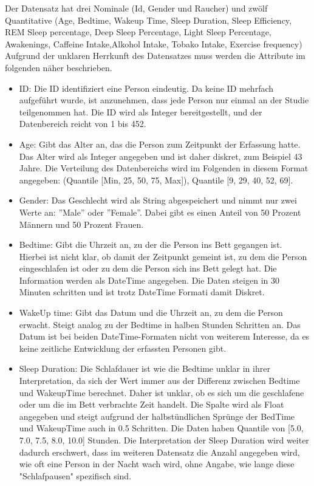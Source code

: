 \documentclass[usegeometry=true]{scrartcl}
\begin{document}
Der Datensatz hat drei Nominale (Id, Gender und Raucher) und zwölf Quantitative (Age, Bedtime, Wakeup Time, Sleep Duration, Sleep Efficiency, REM Sleep percentage, Deep Sleep Percentage, Light Sleep Percentage, Awakenings, Caffeine Intake,Alkohol Intake, Tobako Intake, Exercise frequency) Aufgrund der unklaren Herrkunft des Datensatzes muss werden die Attribute im folgenden näher beschrieben.\\
\begin{itemize}
  \item ID: Die ID identifiziert eine Person eindeutig. Da keine ID mehrfach aufgeführt wurde, ist anzunehmen, dass jede Person nur einmal an der Studie teilgenommen hat. Die ID wird als Integer bereitgestellt, und der Datenbereich reicht von 1 bis 452.
  \item Age: Gibt das Alter an, das die Person zum Zeitpunkt der Erfassung hatte. Das Alter wird als Integer angegeben und ist daher diskret, zum Beispiel 43 Jahre. Die Verteilung des Datenbereichs wird im Folgenden in diesem Format angegeben: (Quantile [Min, 25, 50, 75, Max]), Quantile [9, 29, 40, 52, 69].
  \item Gender: Das Geschlecht wird als String abgespeichert und nimmt nur zwei Werte an: ''Male'' oder ''Female''. Dabei gibt es einen Anteil von 50 Prozent Männern und 50 Prozent Frauen.
  \item Bedtime: Gibt die Uhrzeit an, zu der die Person ins Bett gegangen ist. Hierbei ist nicht klar, ob damit der Zeitpunkt gemeint ist, zu dem die Person eingeschlafen ist oder zu dem die Person sich ins Bett gelegt hat. Die Information werden als DateTime angegeben. Die Daten steigen in 30 Minuten schritten und ist trotz DateTime Formati damit Diskret. 
  \item WakeUp time: Gibt das Datum und die Uhrzeit an, zu dem die Person erwacht. Steigt analog zu der Bedtime in halben Stunden Schritten an. Das Datum ist bei beiden DateTime-Formaten nicht von weiterem Interesse, da es keine zeitliche Entwicklung der erfassten Personen gibt.
  \item Sleep Duration: Die Schlafdauer ist wie die Bedtime unklar in ihrer Interpretation, da sich der Wert immer aus der Differenz zwischen Bedtime und WakeupTime berechnet. Daher ist unklar, ob es sich um die geschlafene oder um die im Bett verbrachte Zeit handelt. Die Spalte wird als Float angegeben und steigt aufgrund der halbstündlichen Sprünge der BedTime und WakeupTime auch in 0.5 Schritten. Die Daten haben Quantile von [5.0, 7.0, 7.5, 8.0, 10.0] Stunden. Die Interpretation der Sleep Duration wird weiter dadurch erschwert, dass im weiteren Datensatz die Anzahl angegeben wird, wie oft eine Person in der Nacht wach wird, ohne Angabe, wie lange diese "Schlafpausen" spezifisch sind.

\end{itemize}
\end{document}
